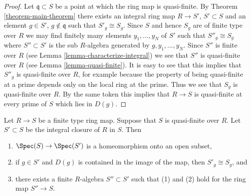 \begin{proof}
Let $\mathfrak q \subset S$ be a point at which the ring map
is quasi-finite. By Theorem \ref{theorem-main-theorem}
there exists an integral ring map $R \to S'$, $S' \subset S$
and an element $g \in S'$, $g\not \in \mathfrak q$ such that
$S'_g \cong S_g$. Since $S$ and hence $S_g$ are of finite type
over $R$ we may find finitely many elements
$y_1, \ldots, y_N$ of $S'$ such that $S''_g \cong S_g$
where $S'' \subset S'$ is the sub $R$-algebra generated
by $g, y_1, \ldots, y_N$. Since $S''$ is finite over $R$
(see Lemma \ref{lemma-characterize-integral}) we see that
$S''$ is quasi-finite over $R$ (see Lemma \ref{lemma-quasi-finite}).
It is easy to see that this implies that $S''_g$ is quasi-finite over $R$,
for example because the property of being quasi-finite at a prime depends
only on the local ring at the prime. Thus we see that $S_g$ is quasi-finite
over $R$. By the same token this implies that $R \to S$ is quasi-finite
at every prime of $S$ which lies in $D(g)$.
\end{proof}

\begin{lemma}
\label{lemma-quasi-finite-open-integral-closure}
Let $R \to S$ be a finite type ring map.
Suppose that $S$ is quasi-finite over $R$.
Let $S' \subset S$ be the integral closure of $R$ in $S$. Then
\begin{enumerate}
\item $\Spec(S) \to \Spec(S')$ is a homeomorphism
onto an open subset,
\item if $g \in S'$ and $D(g)$ is contained in the image
of the map, then $S'_g \cong S_g$, and
\item there exists a finite $R$-algebra $S'' \subset S'$
such that (1) and (2) hold for the ring map
$S'' \to S$.
\end{enumerate}
\end{lemma}

